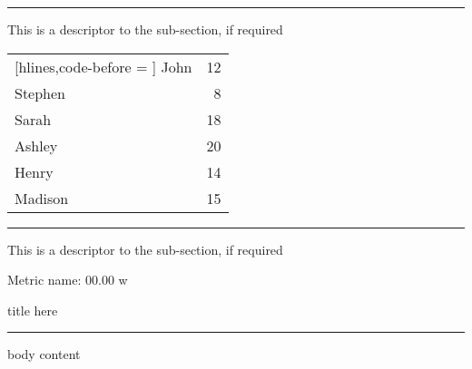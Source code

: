 \documentclass{article}
\begin{document}
\begin{multicols*}{2}

\noindent
{}
{\color{colorPrimary} \hrule}
\noindent
\textnormal{This is a descriptor to the sub-section, if required}

\begin{NiceTabular}{lr}[hlines,code-before = ]
John & 12 \\
Stephen & 8 \\
Sarah & 18 \\
Ashley & 20 \\
Henry & 14 \\
Madison & 15
\end{NiceTabular}

\noindent
{}
{\color{colorPrimary} \hrule}
\noindent
\textnormal{This is a descriptor to the sub-section, if required}

\begin{metricbar}
\textnormal{\small{Metric name:}} \textnormal{\large{00.00}} \textnormal{\small{w}}
\end{metricbar}

\begin{sectionbox}
title here
\hrule
\tcblower
body content
\end{sectionbox}


\end{multicols*}
\end{document}
